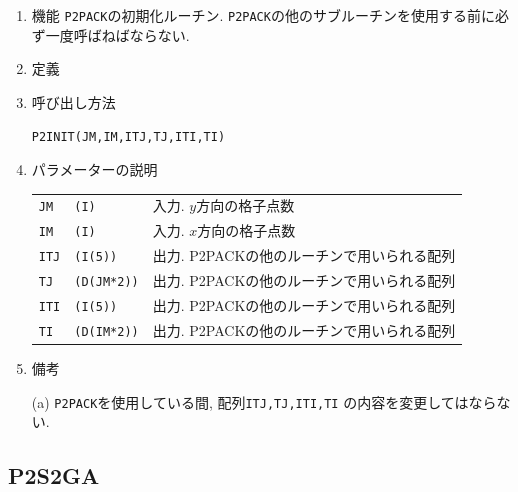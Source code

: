 \documentclass[a4j,fleqn]{jarticle}
\begin{document}
\begin{enumerate}

\item 機能 
{\tt P2PACK}の初期化ルーチン. 
{\tt P2PACK}の他のサブルーチンを使用する前に必ず一度呼ばねばならない.

\item 定義

\item 呼び出し方法 
    
{\tt P2INIT(JM,IM,ITJ,TJ,ITI,TI)}
  
\item パラメーターの説明 
    
\begin{tabular}{lll}
{\tt JM} & {\tt (I)} & 入力. $y$方向の格子点数\\
{\tt IM} & {\tt (I)} & 入力. $x$方向の格子点数\\
{\tt ITJ}  & {\tt (I(5))}    & 出力. P2PACKの他のルーチンで用いられる配列\\
{\tt TJ}   & {\tt (D(JM*2))} & 出力. P2PACKの他のルーチンで用いられる配列\\
{\tt ITI}  & {\tt (I(5))}    & 出力. P2PACKの他のルーチンで用いられる配列\\
{\tt TI}   & {\tt (D(IM*2))} & 出力. P2PACKの他のルーチンで用いられる配列
\end{tabular}

\item 備考

(a) {\tt P2PACK}を使用している間, 配列{\tt ITJ,TJ,ITI,TI}
の内容を変更してはならない.

\end{enumerate}


\subsection{P2S2GA}
\end{document}
